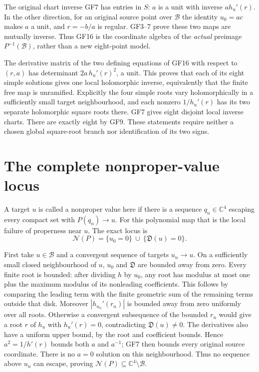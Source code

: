 \documentclass[11pt]{article}
\newcommand{\C}{\mathbb C}
\begin{document}
The original chart inverse GF7 has entries in $S$: $a$ is a unit
with inverse $a h_u'(r)$. In the other direction, for an original
source point over $\mathcal B$ the identity $u_0=ac$ makes $a$
a unit, and $r=-b/a$ is regular. GF3--7 prove these two maps are
mutually inverse. Thus GF16 is the coordinate algebra of the
\emph{actual} preimage $P^{-1}(\mathcal B)$, rather than a new
eight-point model.

The derivative matrix of the two defining equations of GF16 with
respect to $(r,a)$ has determinant
$2a\,h_u'(r)^2$, a unit. This proves that each of its eight simple
solutions gives one local holomorphic inverse, equivalently that
the finite free map is unramified. Explicitly the four simple roots
vary holomorphically in a sufficiently small target neighbourhood,
and each nonzero $1/h_u'(r)$ has its two separate holomorphic
square roots there. GF7 gives eight disjoint local inverse charts.
There are exactly eight by GF9. These statements require neither
a chosen global square-root branch nor identification of its two signs.

\section{The complete nonproper-value locus}
A target $u$ is called a nonproper value here if there is a sequence
$q_n\in\C^4$ escaping every compact set with $P(q_n)\to u$.
For this polynomial map that is the local failure of properness
near $u$. The exact locus is
\begin{equation}
 \boxed{\quad\mathcal N(P)=\{u_0=0\}\ \cup\ \{\mathfrak D(u)=0\}.\quad}
 \tag{GF17}
\end{equation}

First take $u\in\mathcal B$ and a convergent sequence of targets
$u_n\to u$. On a sufficiently small closed neighbourhood of $u$,
$u_0$ and $\mathfrak D$ are bounded away from zero. Every finite
root is bounded: after dividing $h$ by $u_0$, any root has modulus
at most one plus the maximum modulus of its nonleading
coefficients. This follows by comparing the leading term with
the finite geometric sum of the remaining terms outside that disk.
Moreover $|h_{u_n}'(r_n)|$ is bounded away from zero uniformly over
all roots. Otherwise a convergent subsequence of the bounded
$r_n$ would give a root $r$ of $h_u$ with $h_u'(r)=0$,
contradicting $\mathfrak D(u)\ne0$. The derivatives also have a
uniform upper bound, by the root and coefficient bounds. Hence
$a^2=1/h'(r)$ bounds both $a$ and $a^{-1}$; GF7 then bounds every
original source coordinate. There is no $a=0$ solution on this
neighbourhood. Thus no sequence above $u_n$ can escape, proving
$\mathcal N(P)\subseteq\C^4\setminus\mathcal B$.
\end{document}
